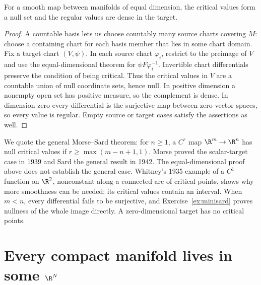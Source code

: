 \begin{corollary}\label{cor:sardmfd}
For a smooth map between manifolds of equal dimension, the critical values form a null set and the regular values are dense in the target.
\end{corollary}
\begin{proof}
A countable basis lets us choose countably many source charts covering $M$: choose a containing chart for each basis member that lies in some chart domain. Fix a target chart $(V,\psi)$. In each source chart $\varphi_i$, restrict to the preimage of $V$ and use the equal-dimensional theorem for $\psi F\varphi_i^{-1}$. Invertible chart differentials preserve the condition of being critical. Thus the critical values in $V$ are a countable union of null coordinate sets, hence null. In positive dimension a nonempty open set has positive measure, so the complement is dense. In dimension zero every differential is the surjective map between zero vector spaces, so every value is regular. Empty source or target cases satisfy the assertions as well.
\end{proof}

\begin{remark}
We quote the general Morse--Sard theorem: for $n\ge1$, a $C^r$ map $\R^m\to\R^n$ has null critical values if $r\ge\max(m-n+1,1)$. Morse proved the scalar-target case in 1939 and Sard the general result in 1942. The equal-dimensional proof above does not establish the general case. Whitney's 1935 example of a $C^1$ function on $\R^2$, nonconstant along a connected arc of critical points, shows why more smoothness can be needed: its critical values contain an interval. When $m<n$, every differential fails to be surjective, and Exercise~\ref{ex:minisard} proves nullness of the whole image directly. A zero-dimensional target has no critical points.
\end{remark}

\section{Every compact manifold lives in some \texorpdfstring{$\R^N$}{R\^{}N}}

